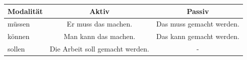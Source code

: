 \begin{center}
\begin{tabular}{|l|c|c|}
\hline
Modalität & Aktiv & Passiv \\ \hline
müssen & Er muss das machen. & Das muss gemacht werden. \\ \hline
können & Man kann das machen. & Das kann gemacht werden. \\ \hline
sollen & Die Arbeit soll gemacht werden. & - \\ \hline
\end{tabular}
\end{center}

\chapterend